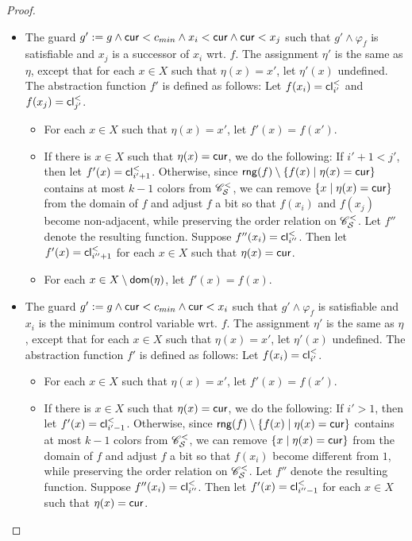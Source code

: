 \begin{appendix}
{\begin{proof}
\begin{itemize}
\begin{itemize}
\item The guard $g': = g \wedge \mathsf{cur} < c_{min} \wedge  x_i < \mathsf{cur} \wedge \mathsf{cur} < x_j$ such that $g' \wedge \varphi_f$ is satisfiable and $x_j$ is a successor of $x_i$ wrt. $f$. The assignment $\eta'$ is the same as $\eta$, except that for each $x \in X$ such that $\eta(x)=x'$, let $\eta'(x)$ undefined.  The abstraction function $f'$ is defined as follows: Let $f(x_i)=\mathsf{cl}^{<}_{i'}$ and $f(x_j)=\mathsf{cl}^{<}_{j'}$. 
\begin{itemize}
\item For each $x \in X$ such that $\eta(x)=x'$, let $f'(x)=f(x')$.
%
\item If there is $x \in X$ such that $\eta(x)=\mathsf{cur}$, we do the following: If $i'+1 < j'$, then let $f'(x)= \mathsf{cl}^{<}_{i'+1}$. Otherwise, since $\mathsf{rng}(f) \setminus \{f(x) \mid \eta(x)=\mathsf{cur}\}$ contains at most $k-1$ colors from $\mathscr{C}^<_{\mathcal{S} }$,  we can remove $\{x\mid \eta(x)=\mathsf{cur}\}$ from the domain of $f$ and adjust $f$ a bit so that $f(x_i)$ and $f(x_j)$ become non-adjacent, while preserving the order relation on $\mathscr{C}^<_{\mathcal{S} }$. Let $f''$ denote the resulting function. Suppose $f''(x_i)=\mathsf{cl}^<_{i''}$. Then let $f'(x)=\mathsf{cl}^<_{i''+1}$  for each $x \in X$ such that $\eta(x)=\mathsf{cur}$.
%
\item For each $x \in X \setminus \mathsf{dom}(\eta)$, let $f'(x)=f(x)$. 
\end{itemize}

\item The guard $g' := g \wedge \mathsf{cur} < c_{min} \wedge  \mathsf{cur} < x_i$ such that $g' \wedge \varphi_f$ is satisfiable and $x_i$ is the minimum control variable wrt. $f$. The assignment $\eta'$ is the same as $\eta$, except that for each $x \in X$ such that $\eta(x)=x'$, let $\eta'(x)$ undefined.  The abstraction function $f'$ is defined as follows: Let $f(x_i)=\mathsf{cl}^<_{i'}$.
\begin{itemize}
\item For each $x \in X$ such that $\eta(x)=x'$, let $f'(x)=f(x')$.
%
\item If there is $x \in X$ such that $\eta(x)=\mathsf{cur}$, we do the following: If $i' > 1$, then let $f'(x)= \mathsf{cl}^{<}_{i'-1}$. Otherwise, since $\mathsf{rng}(f) \setminus \{f(x) \mid \eta(x)=\mathsf{cur}\}$ contains at most $k-1$ colors from $\mathscr{C}^<_{\mathcal{S} }$,  we can remove $\{x \mid \eta(x)=\mathsf{cur}\}$ from the domain of $f$ and adjust $f$ a bit so that $f(x_i)$ become different from $1$, while preserving the order relation on $\mathscr{C}^<_{\mathcal{S} }$. Let $f''$ denote the resulting function. Suppose $f''(x_i)=\mathsf{cl}^<_{i''}$. Then let $f'(x)=\mathsf{cl}^<_{i''-1}$ for each $x \in X$ such that $\eta(x)=\mathsf{cur}$. 


\end{itemize}
\end{itemize}
\end{itemize}
\end{proof}}
\end{appendix}
